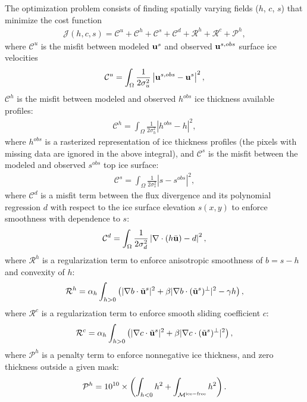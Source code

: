\documentclass[10pt,twocolumn]{article}
\begin{document}
The optimization problem consists of finding spatially varying fields 
($h$, $c$, $s$) that minimize the cost function
\begin{align}
\mathcal{J}(h,c,s)=\mathcal{C}^u+\mathcal{C}^h+\mathcal{C}^s
+\mathcal{C}^{d}+\mathcal{R}^h+\mathcal{R}^{c}+\mathcal{P}^h,
\end{align}
where $\mathcal{C}^u$ is the misfit between modeled ${\bf u}^{s}$ and observed 
${\bf u}^{s,obs}$ surface ice velocities 
\begin{align}
\mathcal{C}^u=\int_{\Omega}\frac{1}{2\sigma_u^2}\left|{\bf u}^{s,obs}-{\bf u}^{s}\right|^2,
\end{align} 
$\mathcal{C}^h$ is the misfit between modeled and observed $h^{obs}$ ice thickness available profiles:
\begin{align}
\mathcal{C}^h= \int_{\Omega}\frac{1}{2 \sigma_h^2}|h^{obs} -h |^2,
\end{align}
where $h^{obs}$ is a rasterized representation of ice thickness profiles
(the pixels with missing data are ignored in the above integral), and
$\mathcal{C}^s$ is the misfit between the modeled and observed $s^{obs}$ top ice surface:
\begin{align}
\mathcal{C}^s=\int_{\Omega}\frac{1}{2 \sigma_s^2}\left|s-s^{obs}\right|^2,
\end{align}
where $\mathcal{C}^{d}$ is a misfit term between the flux divergence and its polynomial 
regression $d$ with respect to the ice surface elevation $s(x,y)$ to enforce smoothness 
with  dependence to $s$:
\begin{align}
\mathcal{C}^{d}=\int_{\Omega}\frac{1}{2 \sigma_d^2}\left|\nabla \cdot (h {\bar{\bf u}})-d \right|^2,
\end{align}
where $\mathcal{R}^h$ is a regularization term to enforce anisotropic smoothness of $b=s-h$
and convexity of $h$:
\begin{align}
\mathcal{R}^h=\alpha_h\int_{h>0}\left(|\nabla b \cdot \tilde{{\bf u}}^{s} |^2+\beta|\nabla b \cdot (\tilde{{\bf u}}^{s})^{\perp} |^2-\gamma h\right),
\end{align}
where $\mathcal{R}^{c}$ is a regularization term to enforce smooth sliding coefficient $c$:
\begin{align}
\mathcal{R}^c=\alpha_h\int_{h>0}\left(|\nabla c \cdot \tilde{{\bf u}}^{s} |^2+\beta|\nabla c \cdot (\tilde{{\bf u}}^{s})^{\perp} |^2 \right),
\end{align}
where $\mathcal{P}^h$ is a penalty term to enforce nonnegative ice thickness, 
and zero thickness outside a given mask:
\begin{align}
\mathcal{P}^h=10^{10} \times \left(\int_{h<0} h^2+\int_{\mathcal{M}^{\rm ice-free}} h^2 \right).
\end{align}
\end{document}
